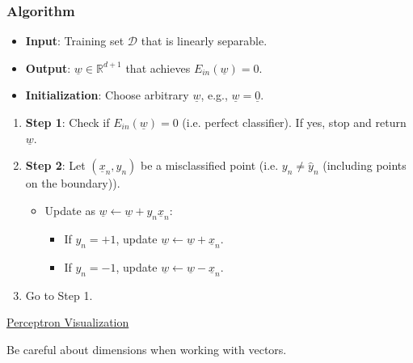     \subsubsection{Algorithm}
    \begin{definition}
        \begin{itemize}
            \item \textbf{Input}: Training set $\mathcal{D}$ that is linearly separable.
            \item \textbf{Output}: $\underline{w} \in \mathbb{R}^{d+1}$ that achieves $E_{in}(\underline{w}) = 0$.
            \item \textbf{Initialization}: Choose arbitrary $\underline{w}$, e.g., $\underline{w} = \underline{0}$.
        \end{itemize}

        \begin{enumerate}
            \item \textbf{Step 1}: Check if $E_{in}(\underline{w}) = 0$ (i.e. perfect classifier). If yes, stop and return $\underline{w}$.
            \item \textbf{Step 2}: Let $(\underline{x}_n, y_n)$ be a misclassified point (i.e. $y_n \neq \hat{y}_n$ (including points on the boundary)).
            \begin{itemize}
                \item Update as $\underline{w} \leftarrow \underline{w} + y_n \underline{x}_n$:
                \begin{itemize}
                    \item If $y_n = +1$, update $\underline{w} \leftarrow \underline{w} + \underline{x}_n$.
                    \item If $y_n = -1$, update $\underline{w} \leftarrow \underline{w} - \underline{x}_n$.
                \end{itemize}
            \end{itemize}
            \item Go to Step 1.
        \end{enumerate}
        \href{https://vinizinho.net/projects/perceptron-viz/}{Perceptron Visualization}
    \end{definition}

    \begin{warning}
        Be careful about dimensions when working with vectors.
    \end{warning}

